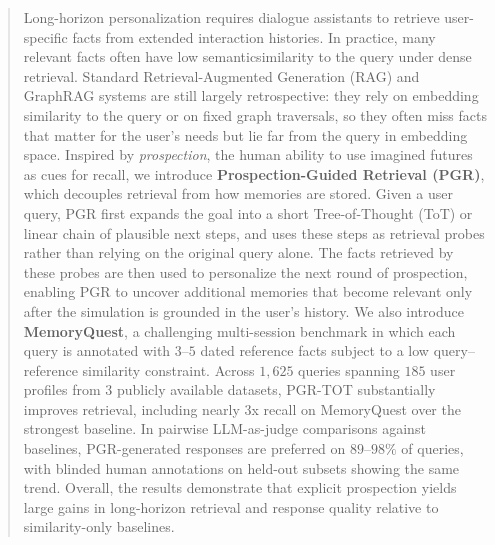 \begin{abstract}
    Long-horizon personalization requires dialogue assistants to retrieve user-specific facts from extended interaction histories.
    In practice, many relevant facts often have low semanticsimilarity to the query under dense retrieval.
    Standard Retrieval-Augmented Generation (RAG) and GraphRAG systems are still largely retrospective: they rely on embedding similarity to the query or on fixed graph traversals, so they often miss facts that matter for the user's needs but lie far from the query in embedding space.
    Inspired by \emph{prospection}, the human ability to use imagined futures as cues for recall, we introduce \textbf{Prospection-Guided Retrieval (PGR)}, which decouples retrieval from how memories are stored.
    Given a user query, PGR first expands the goal into a short Tree-of-Thought (ToT) or linear chain of plausible next steps, and uses these steps as retrieval probes rather than relying on the original query alone.
    The facts retrieved by these probes are then used to personalize the next round of prospection, enabling PGR to uncover additional memories that become relevant only after the simulation is grounded in the user's history.
    We also introduce \textbf{MemoryQuest}, a challenging multi-session benchmark in which each query is annotated with $3$--$5$ dated reference facts subject to a low query--reference similarity constraint.
    Across $1{,}625$ queries spanning $185$ user profiles from 3 publicly available datasets, PGR-TOT substantially improves retrieval, including nearly 3x recall on MemoryQuest over the strongest baseline.
    In pairwise LLM-as-judge comparisons against baselines, PGR-generated responses are preferred on $89$--$98\%$ of queries, with blinded human annotations on held-out subsets showing the same trend.
    Overall, the results demonstrate that explicit prospection yields large gains in long-horizon retrieval and response quality relative to similarity-only baselines.
\end{abstract}